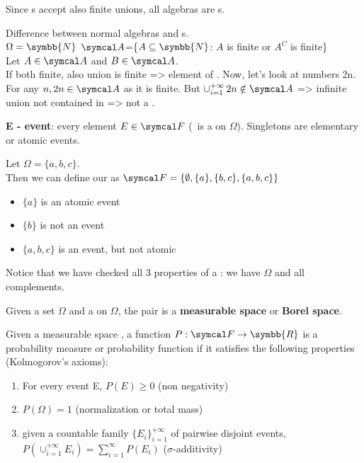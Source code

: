 Since \sigal s accept also finite unions, all algebras are \sigal s.
\begin{example}
Difference between normal algebras and \sigal s.\\$\Omega = \symbb{N}$ $\aii$=\{$A \subseteq \symbb{N}$: $A$ is finite or $A^C$ is finite\}\\Let $A \in \aii$ and $B \in \aii$.\\If both finite, also union is finite => element of \aii. Now, let's look at numbers 2n. For any $n, 2n \in \aii$ as it is finite. But $\cup^{+\infty}_{i=1}\,2n \notin \aii$ => infinite union not contained in \aii => not a \sigal.
\end{example}
\begin{definition}
    \textbf{E - event}: every element $E \in \eff$ (\eff\, is a \sigal on $\Omega$). Singletons are elementary or atomic events.
\end{definition}
\begin{example}
    Let $\Omega=\{a, b, c\}$.\\Then we can define our \sigal{} as $\eff =\{\emptyset, \{a\}, \{b, c\}, \{a, b, c\}\}$
    \begin{itemize}
        \item $\{a\}$ is an atomic event
        \item $\{b\}$ is not an event
        \item $\{a, b, c\}$ is an event, but not atomic
    \end{itemize}
    Notice that we have checked all 3 properties of a \sigal: we have $\Omega$ and all complements.
\end{example}
\begin{definition}
    Given a set $\Omega$ and a \sigal{} \eff{}  on $\Omega$, the pair \borel{}is a \textbf{measurable space} or \textbf{Borel space}.
\end{definition}
\begin{definition}
    Given a measurable space \borel, a function $P: \eff \to \symbb{R}$ is a probability measure or probability function if it satisfies the following properties (Kolmogorov's axioms):
    \begin{enumerate}
        \item For every event E, $P(E) \ge 0$ (non negativity)
        \item $P(\Omega) = 1$ (normalization or total mass)
        \item given a countable family $\{E_i\}^{+\infty}_{i=1}$ of pairwise disjoint events, $P(\cup^{+\infty}_{i=1}E_i) = \sum_{i=1}^{\infty} P(E_i)$ ($\sigma$-additivity)
    \end{enumerate}
\end{definition}

